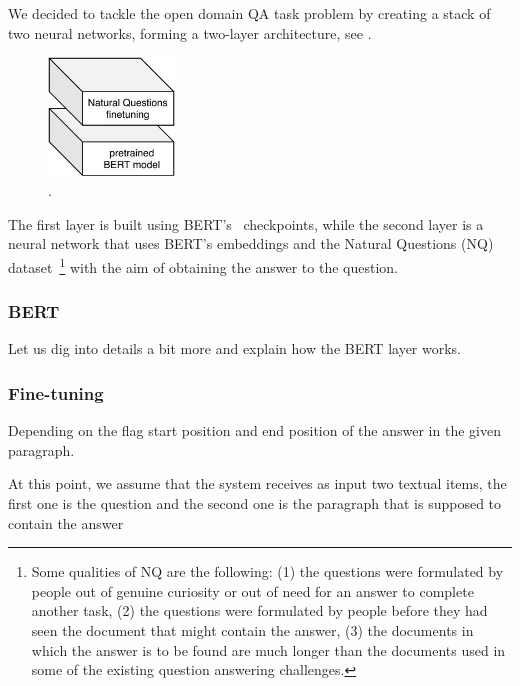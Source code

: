 \documentclass[11pt,hidelinks]{article}
\begin{document}
We decided to tackle the open domain QA task problem by creating a stack of two neural networks, forming a two-layer architecture, see .

\begin{figure}[ht!]
    \centering
    \includegraphics[width=0.3\textwidth]{pics/broad_architecture.pdf}
    \caption{.}\label{fig:broad_architecture}
\end{figure}

The first layer is built using BERT's~\cite{devlin2018bert} checkpoints, while the second layer is a neural network that uses BERT's embeddings and the Natural Questions (NQ)~\cite{kwiatowski} dataset~\footnote{Some qualities of NQ are the following: (1) the questions were formulated by people out of genuine curiosity or out of need for an answer to complete another task, (2) the questions were formulated by people before they had seen the document that might contain the answer, (3) the documents in which the answer is to be found are much longer than the documents used in some of the existing question answering challenges.} with the aim of obtaining the answer to the question.

\subsubsection{BERT}
Let us dig into details a bit more and explain how the BERT layer works.

\subsubsection{Fine-tuning}
Depending on the flag
start position and end position of the answer in the given paragraph.









At this point, we assume that the system receives as input two textual items, the first one is the question and the second one is the paragraph that is supposed to contain the answer
\end{document}

